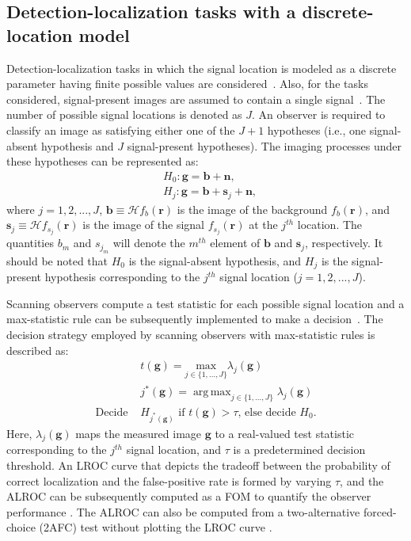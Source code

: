 \documentclass[journal]{IEEEtran}
\renewcommand{\vec}[1]{\mathbf{#1}}
\DeclareMathOperator*{\argmax}{arg\,max}
\begin{document}
\subsection{Detection-localization tasks with a discrete-location model}
Detection-localization tasks 
in which the signal location is modeled as a discrete parameter having finite possible values are considered~\cite{khurd2005decision}.
Also, for the tasks considered, signal-present images are assumed
to contain a single signal~\cite{khurd2005decision}.
The number of possible signal locations is denoted as $J$. 
An observer is required to classify an image as satisfying either 
one of the $J+1$ hypotheses (i.e., one signal-absent hypothesis and $J$ signal-present hypotheses). 
The imaging processes under these hypotheses can be represented as:
\begin{equation}\label{eq:imgH}
\begin{split}
&H_{0}:  \mathbf{g} = \mathbf{b}+ \mathbf{n}, \\
&H_{j}:  \mathbf{g} = \mathbf{b}+\mathbf{s}_j + \mathbf{n}, 
\end{split}
\end{equation}
where $j = 1,2,...,J$, $\vec{b} \equiv \mathcal{H}f_b(\vec{r})$ is the image of the background
  $f_b(\vec{r})$, and $\vec{s}_j \equiv \mathcal{H}f_{s_j}(\vec{r})$ is the 
image of the signal $f_{s_j}(\vec{r})$ at the $j^{th}$ location. 
The quantities $b_m$ and $s_{j_m}$ will denote the $m^{th}$ element of $\vec{b}$ and $\vec{s}_j$, respectively.
It should be noted that $H_0$ is the signal-absent hypothesis, and $H_j$ is the signal-present hypothesis corresponding to the $j^{th}$ signal location ($j = 1,2,...,J$).

Scanning observers compute a test statistic for each possible signal location 
and a max-statistic rule can be subsequently implemented to make a decision~\cite{gifford2016visual}.
The decision strategy employed by scanning observers
with max-statistic rules is described as\cite{gifford2016visual}:
\begin{equation}
\begin{split}
&t(\mathbf{g}) =  \underset{j\in\{1,...,J\}}{\text{max} } \lambda_j(\vec{g})  \\
&j^*(\mathbf{g}) =\argmax_{j\in\{1,...,J\}} \lambda_j(\vec{g})\\
\text{Decide } &\text{$H_{j^*(\mathbf{g})}$ if $t(\mathbf{g}) > \tau$, else decide $H_0$}.
\end{split}
\end{equation}
Here, $\lambda_j(\vec{g})$ maps the measured image $\vec{g}$ to a real-valued test statistic corresponding to the $j^{th}$ signal location, and $\tau$ is a predetermined decision threshold.
{An LROC curve that depicts the tradeoff between the probability of correct localization and the false-positive rate is formed by varying $\tau$, and the ALROC can be subsequently computed as a FOM to quantify the observer performance \cite{khurd2005decision}. The ALROC can also be computed from a two-alternative forced-choice (2AFC) test without plotting the LROC curve \cite{clarkson2007estimation}.}
\end{document}
